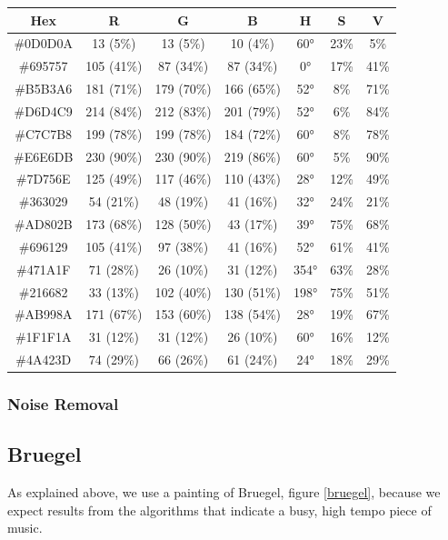 \documentclass[12pt]{article}
\begin{document}
\begin{tabular}{| c | c | c | c | c | c | c |}
\hline
Hex & R & G & B & H & S & V \\
\hline
\#0D0D0A & 13 (5\%) & 13 (5\%) & 10 (4\%) &  60° & 23\% & 5\% \\ 
\hline
\#695757 & 105 (41\%) & 87 (34\%) & 87 (34\%) & 0° & 17\% & 41\% \\ 
\hline
\#B5B3A6 & 181 (71\%) & 179 (70\%) & 166 (65\%) & 52° & 8\% & 71\% \\ 
\hline
\#D6D4C9 & 214 (84\%) & 212 (83\%) & 201 (79\%) & 52° & 6\% & 84\% \\ 
\hline
\#C7C7B8 & 199 (78\%) & 199 (78\%) & 184 (72\%) & 60° & 8\% & 78\% \\ 
\hline
\#E6E6DB & 230 (90\%) & 230 (90\%) & 219 (86\%) & 60° & 5\% & 90\% \\ 
\hline
 \#7D756E & 125 (49\%) & 117 (46\%) & 110 (43\%) & 28° & 12\% & 49\% \\ 
\hline
\#363029 & 54 (21\%) & 48 (19\%) & 41 (16\%) & 32° & 24\% & 21\% \\ 
\hline
\#AD802B & 173 (68\%) & 128 (50\%) & 43 (17\%) & 39° & 75\% & 68\% \\ 
\hline
\#696129 & 105 (41\%) & 97 (38\%) & 41 (16\%) & 52° & 61\% & 41\% \\ 
\hline
\#471A1F & 71 (28\%) & 26 (10\%) & 31 (12\%) & 354° & 63\% & 28\% \\ 
\hline
\#216682 & 33 (13\%) & 102 (40\%) & 130 (51\%) & 198° & 75\% & 51\% \\ 
\hline
\#AB998A & 171 (67\%) & 153 (60\%) & 138 (54\%) & 28° & 19\% & 67\% \\ 
\hline
\#1F1F1A & 31 (12\%) & 31 (12\%) & 26 (10\%) & 60° & 16\% & 12\% \\ 
\hline
\#4A423D & 74 (29\%) & 66 (26\%) & 61 (24\%) & 24° & 18\% & 29\% \\ 
\hline
\end{tabular}

\subsubsection{Noise Removal}

\subsection{Bruegel}

As explained above, we use a painting of Bruegel, figure \ref{bruegel}, because we expect results from the algorithms that indicate a busy, high tempo piece of music.
\end{document}

